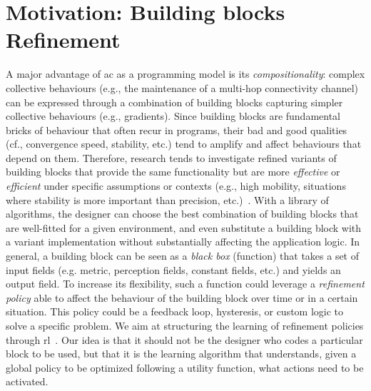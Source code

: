 \section{Motivation: Building blocks Refinement}\label{coordination2022:s:learning-gradient}
A major advantage of \ac{ac} as a programming model is its \emph{compositionality}: complex collective behaviours (e.g., the maintenance of a multi-hop connectivity channel) can be expressed through a combination of building blocks capturing simpler collective behaviours (e.g., gradients).
%
Since building blocks are fundamental bricks of behaviour that often recur in programs, 
 their bad and good qualities (cf., convergence speed, stability, etc.) tend to amplify and affect behaviours that depend on them.
%
Therefore, research tends to investigate refined variants of building blocks that provide the same functionality but are more \emph{effective} or \emph{efficient} under specific assumptions or contexts (e.g., high mobility, situations where stability is more important than precision, etc.)~\cite{DBLP:conf/saso/AudritoCDV17,DBLP:journals/cee/AudritoCDPV21}.
%
With a library of algorithms, 
 the designer can choose the best combination of building blocks that are well-fitted for a given environment, 
 and even substitute a building block with a variant implementation without substantially affecting the application logic.
%
In general, a building block can be seen as a \emph{black box} (function) that takes a set of input fields (e.g. metric, perception fields, constant fields, etc.) and yields an output field. 
%
To increase its flexibility, 
 such a function could leverage a \emph{refinement policy} able to affect the behaviour of the building block over time or in a certain situation. 
%
This policy could be a feedback loop, hysteresis, or custom logic to solve a specific problem.
%
We aim at structuring the learning of refinement policies through \ac{rl}~\cite{DBLP:conf/acsos/Aguzzi21}.
%
Our idea is that it should not be the designer who codes a particular block to be used, 
 but that it is the learning algorithm that understands, given a global policy to be optimized following a utility function, 
 what actions need to be activated.



